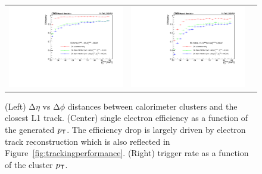  \begin{figure}[tbh!]
 \begin{center}
  \begin{tabular}{ccc}
   \includegraphics[width=.45\linewidth]{figures/Part2/Upgrade/eff_barrel}&
   \includegraphics[width=.45\linewidth]{figures/Part2/Upgrade/eff_endcap}&
  \end{tabular}
  \caption{(Left) $\mathrm{\Delta}\eta$ vs $\mathrm{\Delta}\phi$ distances between calorimeter clusters and the closest L1 track. (Center) single electron efficiency as a function of the generated $p_{\textsf{T}}$. The efficiency drop is largely driven by electron track reconstruction which is also reflected in Figure~\ref{fig:trackingperformance}. (Right) trigger rate as a function of the cluster $p_{\textsf{T}}$.}
 \label{fig:eff_electron}
 \end{center}
\end{figure}

